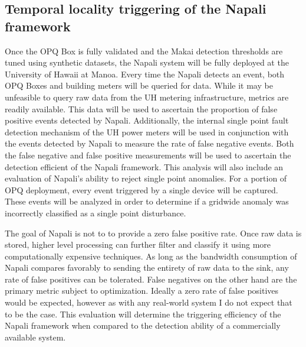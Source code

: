 \subsection{Temporal locality triggering of the Napali framework} \label{iexp:sec:loc}
Once the OPQ Box is fully validated and the Makai detection thresholds are tuned using synthetic datasets, the Napali system will be fully deployed at the University of Hawaii at Manoa.
 Every time the Napali detects an event, both OPQ Boxes and building meters will be queried for data.
 While it may be unfeasible to query raw data from the UH metering infrastructure, metrics are readily available.
 This data will be used to ascertain the proportion of false positive events detected by Napali.
 Additionally, the internal single point fault detection mechanism of the UH power meters will be used in conjunction with the events detected by Napali to measure the rate of false negative events.
 Both the false negative and false positive measurements will be used to ascertain the detection efficient of the Napali framework.
 This analysis will also include an evaluation  of Napali's ability to reject single point anomalies.
 For a portion of OPQ deployment, every event triggered by a single device will be captured.
 These events will be analyzed in order to determine if a gridwide anomaly was incorrectly classified as a single point disturbance.

The goal of Napali is not to to provide a zero false positive rate.
Once raw data is stored, higher level processing can further filter and classify it using more computationally expensive techniques.
As long as the bandwidth consumption of Napali compares favorably to sending the entirety of raw data to the sink, any rate of false positives can be tolerated.
False negatives on the other hand are the primary metric subject to optimization.
Ideally a zero rate of false positives would be expected, however as with any real-world system I do not expect that to be the case.
This evaluation will determine the triggering efficiency of the Napali framework when compared to the detection ability of a commercially available system.

